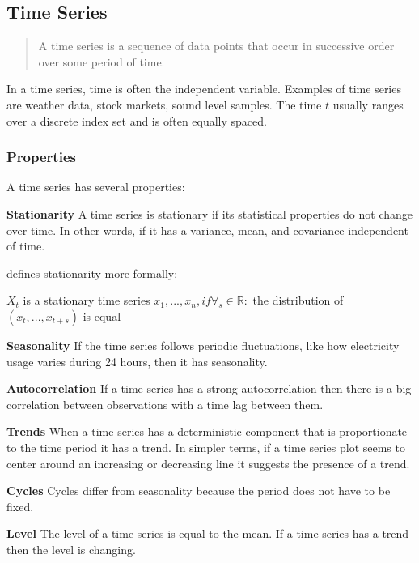 \subsection{Time Series}
\label{sec:time-series}
\begin{quote}
    A time series is a sequence of data
    points that occur in successive order over some period of time.
\end{quote}
\cite{Hayes}

In a time series, time is often the independent variable.
Examples of time series are weather data, stock markets, sound level samples.
The time $t$ usually ranges over a discrete index set and is often equally spaced.

\subsubsection{Properties}
A time series has several properties:


\textbf{Stationarity}
A time series is stationary if its statistical properties do not change over time.
In other words, if it has a variance, mean, and covariance independent of time.

\cite{RobJHyndman2014} defines stationarity more formally:
\begin{definition}
   $X_t$ is a stationary time series 
   $x_1, ..., x_n, if \forall_s \in \mathbb{R} :$
   the distribution of $(x_t, ..., x_{t+s})$ is equal
\end{definition}

\textbf{Seasonality}
If the time series follows periodic fluctuations, like how electricity usage varies during 24 hours,
then it has seasonality.

\textbf{Autocorrelation}
If a time series has a strong autocorrelation then there is a big
correlation between observations with a time lag between them.

\textbf{Trends}
When a time series has a deterministic component that is proportionate to the time period it has a trend.
In simpler terms, if a time series plot seems to center around an increasing or decreasing line it suggests the presence of a trend.

\textbf{Cycles}
Cycles differ from seasonality because the period does not have to be fixed.


\textbf{Level}
The level of a time series is equal to the mean. If a time series has a trend
then the level is changing.


